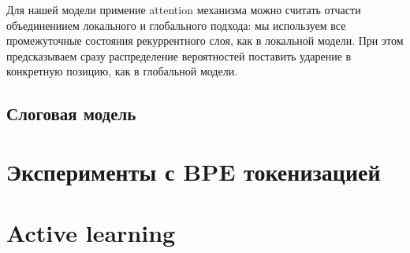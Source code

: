 \documentclass[14pt, a4paper, russian]{report}
\newtheorem{definition}{\indent Определение}
\newtheorem{notation}{\indent Обозначение}
\begin{document}
\begin{normalsize}
Для нашей модели примение attention механизма можно считать отчасти объединениием локального и глобального подхода: мы используем все промежуточные состояния рекуррентного слоя, как в локальной модели. При этом предсказываем сразу распределение вероятностей поставить ударение в конкретную позицию, как в глобальной модели.
\subsection{Слоговая модель}
\section{Эксперименты с BPE токенизацией}



\section{Active learning}





\end{normalsize}
\end{document}
